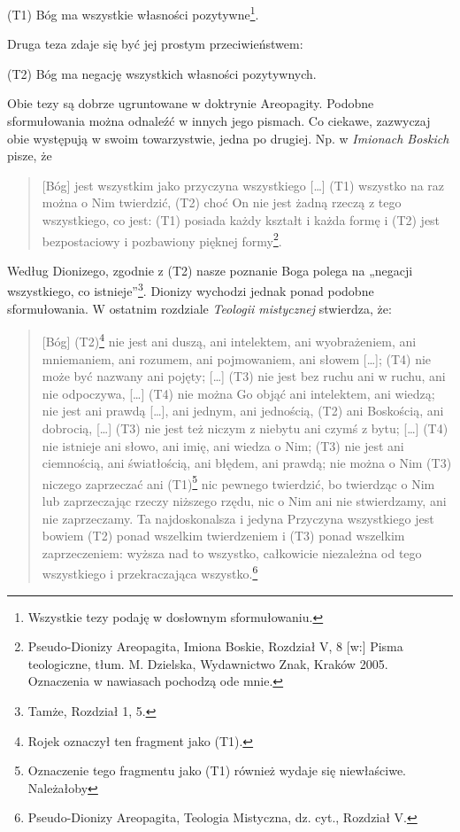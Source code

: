 \bigskip

\noindent (T1) Bóg ma wszystkie własności pozytywne\footnote{Wszystkie tezy
podaję w dosłownym sformułowaniu. }.

\bigskip

Druga teza zdaje się być jej prostym przeciwieństwem:


\bigskip

\noindent (T2) Bóg ma negację wszystkich własności pozytywnych.


\bigskip

Obie tezy są dobrze ugruntowane w doktrynie Areopagity. Podobne
sformułowania można odnaleźć w innych jego pismach. Co ciekawe,
zazwyczaj obie występują w swoim towarzystwie, jedna po drugiej.  Np. w
\textit{Imionach Boskich} pisze, że

\begin{quote}
    [Bóg] jest wszystkim jako przyczyna wszystkiego […] (T1) wszystko na raz
można o Nim twierdzić, (T2) choć On nie jest żadną rzeczą z tego
wszystkiego, co jest: (T1) posiada każdy kształt i każda formę i (T2)
jest bezpostaciowy i pozbawiony pięknej formy\footnote{Pseudo-Dionizy
Areopagita, Imiona Boskie, Rozdział V, 8 [w:]  Pisma teologiczne, tłum.
M. Dzielska, Wydawnictwo Znak, Kraków 2005. Oznaczenia w nawiasach
pochodzą ode mnie.}.
\end{quote}


Według Dionizego, zgodnie z (T2) nasze poznanie Boga polega na „negacji
wszystkiego, co istnieje”\footnote{Tamże, Rozdział 1, 5. }.
Dionizy wychodzi jednak ponad podobne sformułowania. W ostatnim
rozdziale \textit{Teologii mistycznej} stwierdza, że:

\begin{quote}
    [Bóg] (T2)\footnote{Rojek oznaczył ten fragment jako (T1). } nie
jest ani duszą, ani intelektem, ani wyobrażeniem, ani mniemaniem, ani
rozumem, ani pojmowaniem, ani słowem […]; (T4) nie może być nazwany ani
pojęty; […] (T3) nie jest bez ruchu ani w ruchu, ani nie odpoczywa, […]
(T4) nie można Go objąć ani intelektem, ani wiedzą; nie jest ani prawdą
[…], ani jednym, ani jednością, (T2) ani Boskością, ani dobrocią, […]
(T3) nie jest też niczym z niebytu ani czymś z bytu; […] (T4) nie
istnieje ani słowo, ani imię, ani wiedza o Nim; (T3) nie jest ani
ciemnością, ani światłością, ani błędem, ani prawdą; nie można o Nim
(T3) niczego zaprzeczać ani (T1)\footnote{Oznaczenie tego fragmentu
jako (T1) również wydaje się niewłaściwe. Należałoby } nic pewnego
twierdzić, bo twierdząc o Nim lub zaprzeczając rzeczy niższego rzędu,
nic o Nim ani nie stwierdzamy, ani nie zaprzeczamy. Ta najdoskonalsza i
jedyna Przyczyna wszystkiego jest bowiem (T2) ponad wszelkim
twierdzeniem i (T3) ponad wszelkim zaprzeczeniem: wyższa nad to
wszystko, całkowicie niezależna od tego wszystkiego i przekraczająca
wszystko.\footnote{Pseudo-Dionizy Areopagita, Teologia Mistyczna, dz.
cyt., Rozdział V. }
\end{quote}




